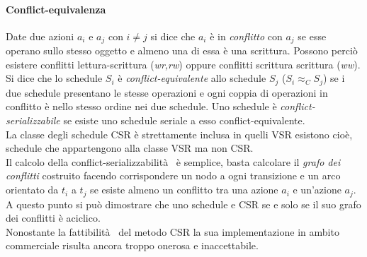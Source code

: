 \paragraph{Conflict-equivalenza} Date due azioni $a_i$ e $a_j$ con $i \neq j$ si dice che $a_i$ è in \emph{conflitto} con $a_j$ se esse operano sullo stesso oggetto e almeno una di essa è una scrittura.
Possono perciò esistere conflitti lettura-scrittura (\emph{wr,rw}) oppure conflitti scrittura scrittura (\emph{ww}).\\
Si dice che lo schedule $S_i$ è \emph{conflict-equivalente} allo schedule $S_j$ ($S_i \approx_C S_j$) se i due schedule presentano le stesse operazioni e ogni coppia di operazioni in conflitto è nello stesso ordine nei due schedule. Uno schedule è \emph{conflict-serializzabile} se esiste uno schedule seriale a esso conflict-equivalente.\\
La classe degli schedule CSR è strettamente inclusa in quelli VSR esistono cioè, schedule che appartengono alla classe VSR ma non CSR.\\
Il calcolo della conflict-serializzabilità  è semplice, basta calcolare il \emph{grafo dei conflitti} costruito facendo corrispondere un nodo a ogni transizione e un arco orientato da $t_i$ a $t_j$ se esiste almeno un conflitto tra una azione $a_i$ e un'azione $a_j$. A questo punto si può dimostrare che uno schedule e CSR se e solo se il suo grafo dei conflitti è aciclico.\\
Nonostante la fattibilità  del metodo CSR la sua implementazione in ambito commerciale risulta ancora troppo onerosa e inaccettabile.
